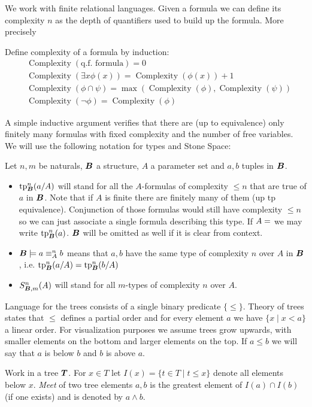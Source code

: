 \documentclass{amsart}
\DeclareMathOperator{\TT}{\boldface T}
\DeclareMathOperator{\B}{\boldface B}
\DeclareMathOperator{\cx}{Complexity}
\begin{document}
We work with finite relational languages. Given a formula we can define its complexity $n$ as the depth of quantifiers used to build up the formula. More precisely
\begin{Definition}
Define complexity of a formula by induction:
\begin{align*}
	&\cx(\text{q.f. formula}) = 0 \\
	&\cx(\exists x \phi(x)) = \cx(\phi(x)) + 1 \\
	&\cx(\phi \cap \psi) = \max(\cx(\phi), \cx(\psi)) \\
	&\cx(\neg \phi) = \cx(\phi)
\end{align*}
\end{Definition}
A simple inductive argument verifies that there are (up to equivalence) only finitely many formulas with fixed complexity and the number of free variables. We will use the following notation for types and Stone Space:
\begin{Definition} Let $n,m$ be naturals, $\B$ a structure, $A$ a parameter set and $a,b$ tuples in $\B$.
	\begin{itemize}
		\item $\tp^n_{\B}(a/A)$ will stand for all the $A$-formulas of complexity $\leq n$ that are true of $a$ in $\B$. Note that if $A$ is finite there are finitely many of them (up tp equivalence). Conjunction of those formulas would still have complexity $\leq n$ so we can just associate a single formula describing this type. If $A = \empty$ we may write $\tp^n_{\B}(a)$. $\B$ will be omitted as well if it is clear from context.
		\item $\B \models a \equiv^n_A b$ means that $a,b$ have the same type of complexity $n$ over $A$ in $\B$, i.e. $\tp^n_{\B}(a/A) = \tp^n_{\B}(b/A)$
		\item $S^n_{\B, m}(A)$ will stand for all $m$-types of complexity $n$ over $A$.
	\end{itemize}
\end{Definition}

Language for the trees consists of a single binary predicate $\{\leq\}$. Theory of trees states that $\leq$ defines a partial order and for every element $a$ we have $\{x \mid x < a\}$ a linear order. For visualization purposes we assume trees grow upwards, with smaller elements on the bottom and larger elements on the top. If $a \leq b$ we will say that $a$ is below $b$ and $b$ is above $a$.

\begin{Definition}
	Work in a tree $\TT$. For $x \in T$ let $I(x) = \{t \in T \mid t \leq x\}$ denote all elements below $x$. \emph{Meet} of two tree elements $a,b$ is the greatest element of $I(a) \cap I(b)$ (if one exists) and is denoted by $a \wedge b$.
\end{Definition}
\end{document}
